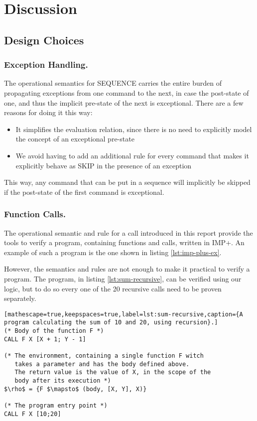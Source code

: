 \section{Discussion}

\subsection{Design Choices}

\subsubsection{Exception Handling.}
The operational semantics for SEQUENCE carries the entire burden of propagating exceptions from one command to the next, in case the post-state of one, and thus the implicit pre-state of the next is exceptional. There are a few reasons for doing it this way:

\begin{itemize}
\item It simplifies the evaluation relation, since there is no need to explicitly model the concept of an exceptional pre-state
\item We avoid having to add an additional rule for every command that makes it explicitly behave as SKIP in the presence of an exception
\end{itemize}

This way, any command that can be put in a sequence will implicitly be skipped if the post-state of the first command is exceptional.

\subsubsection{Function Calls.}
The operational semantic and rule for a call introduced in this report provide the tools to verify a program, containing functions and calls, written in IMP+. An example of such a program is the one shown in listing \ref{lst:imp-plus-ex}.

However, the semantics and rules are not enough to make it practical to verify a program. The program, in listing \ref{lst:sum-recursive}, can be verified using our logic, but to do so every one of the 20 recursive calls need to be proven separately.

\begin{lstlisting}[mathescape=true,keepspaces=true,label=lst:sum-recursive,caption={A program calculating the sum of 10 and 20, using recursion}.]
(* Body of the function F *)
CALL F X [X + 1; Y - 1]

(* The environment, containing a single function F witch
   takes a parameter and has the body defined above.
   The return value is the value of X, in the scope of the 
   body after its execution *)
$\rho$ = {F $\mapsto$ (body, [X, Y], X)}

(* The program entry point *)
CALL F X [10;20]
\end{lstlisting}


